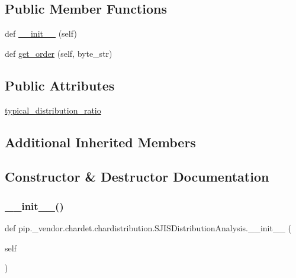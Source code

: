\subsection*{Public Member Functions}
\begin{DoxyCompactItemize}
\item 
def \hyperlink{classpip_1_1__vendor_1_1chardet_1_1chardistribution_1_1SJISDistributionAnalysis_aecf3107a316f30ff89c9e794c869a980}{\+\_\+\+\_\+init\+\_\+\+\_\+} (self)
\item 
def \hyperlink{classpip_1_1__vendor_1_1chardet_1_1chardistribution_1_1SJISDistributionAnalysis_a06a9991cabdf8fdb020daaf5ed717373}{get\+\_\+order} (self, byte\+\_\+str)
\end{DoxyCompactItemize}
\subsection*{Public Attributes}
\begin{DoxyCompactItemize}
\item 
\hyperlink{classpip_1_1__vendor_1_1chardet_1_1chardistribution_1_1SJISDistributionAnalysis_a0a91858f1de0c9b7fea7de572804ae30}{typical\+\_\+distribution\+\_\+ratio}
\end{DoxyCompactItemize}
\subsection*{Additional Inherited Members}


\subsection{Constructor \& Destructor Documentation}
\mbox{\label{classpip_1_1__vendor_1_1chardet_1_1chardistribution_1_1SJISDistributionAnalysis_aecf3107a316f30ff89c9e794c869a980}} 
\subsubsection{\texorpdfstring{\+\_\+\+\_\+init\+\_\+\+\_\+()}{\_\_init\_\_()}}
{\footnotesize\ttfamily def pip.\+\_\+vendor.\+chardet.\+chardistribution.\+S\+J\+I\+S\+Distribution\+Analysis.\+\_\+\+\_\+init\+\_\+\+\_\+ (\begin{DoxyParamCaption}\item[{}]{self }\end{DoxyParamCaption})}



